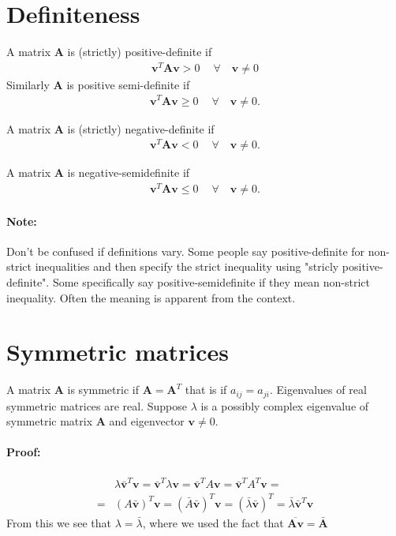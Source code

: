 \section{Definiteness}
A matrix $\bm{A}$ is (strictly) positive-definite if 
\begin{align}
    \bm{v}^T \bm{Av} > 0 \ \quad \forall\quad \bm{v} \neq 0
\end{align}
Similarly $\bm{A}$ is positive semi-definite if 
\begin{align}
    \bm{v}^T \bm{Av} \geq 0 \ \quad \forall\quad \bm{v} \neq 0.
\end{align}

A matrix $\bm{A}$ is (strictly) negative-definite if 
\begin{align}
    \bm{v}^T \bm{Av} < 0 \ \quad \forall\quad \bm{v} \neq 0.
\end{align}

A matrix $\bm{A}$ is negative-semidefinite if 
\begin{align}
    \bm{v}^T \bm{Av} \leq 0 \ \quad \forall\quad \bm{v} \neq 0.
\end{align}

\paragraph{Note:} Don't be confused if definitions vary. Some people say positive-definite for non-strict inequalities and then 
specify the strict inequality using "stricly positive-definite". Some specifically say positive-semidefinite if they mean non-strict inequality.
Often the meaning is apparent from the context.

\section{Symmetric matrices}
A matrix $\bm{A}$ is symmetric if $\bm{A} = \bm{A}^T$ that is if $a_{ij} = a_{ji}$.
Eigenvalues of real symmetric matrices are real.
Suppose $\lambda$ is a possibly complex eigenvalue of symmetric matrix $\bm{A}$ and eigenvector $\bm{v} \neq 0$.

\paragraph{Proof:} 
\begin{align}
      &\lambda {\bar{\bm{v}}}^T \bm{v}   = \bar{\bm{v}}^T \lambda \bm{v} = \bar{\bm{v}}^T A\bm{v} = \bar{\bm{v}}^T A^T \bm{v}  =         \\
     =&(A\bar{\bm{v}})^T \bm{v}       = (\bar{A}\bar{\bm{v}})^T \bm{v} = (\bar{\lambda}\bar{\bm{v}})^T = \bar{\lambda}\bar{\bm{v}}^T \bm{v}  
\end{align}
From this we see that $\lambda = \bar{\lambda}$, where we used the fact that $\overline{\bm{Av}} = \bm{\bar{A}}$    

